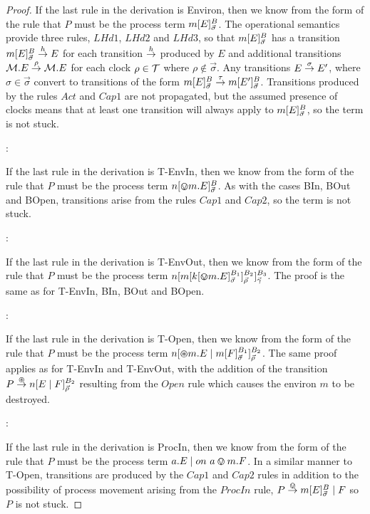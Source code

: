 \begin{proof}
\noindent If the last rule in the derivation is Environ, then we know
from the form of the rule that $P$ must be the process term
${m}[ E ]^{B}_{\vec{\sigma}}$.  The operational semantics provide
three rules, $LHd1$, $LHd2$ and $LHd3$, so that
${m}[ E ]^{B}_{\vec{\sigma}}$ has a transition
${m}[ E ]^{B}_{\vec{\sigma}} \stackrel{h}{\rightarrow} E$ for each transition
$\stackrel{h}{\rightarrow}$ produced by $E$ and additional transitions $\text{$\mathcal{M}$}.E
\stackrel{\rho}{\rightarrow} \text{$\mathcal{M}$}.E$ for each clock $\rho \in \text{$\mathcal{T}$}$ where $\rho
\not \in \vec{\sigma}$.  Any transitions $E \stackrel{\sigma}{\rightarrow} E'$,
where $\sigma \in \vec{\sigma}$ convert to transitions of the form
${m}[ E ]^{B}_{\vec{\sigma}} \stackrel{\tau}{\rightarrow}
{m}[ E' ]^{B}_{\vec{\sigma}}$.  Transitions produced by the rules
$Act$ and $Cap1$ are not propagated, but the assumed presence of
clocks means that at least one transition will always apply to
${m}[ E ]^{B}_{\vec{\sigma}}$, so the term is not stuck.

:

\noindent If the last rule in the derivation is T-EnvIn, then we know
from the form of the rule that $P$ must be the process term
${n}[ \varovee m.E ]^{B}_{\vec{\sigma}}$.  As with the cases BIn, BOut
and BOpen, transitions arise from the rules $Cap1$ and $Cap2$, so the
term is not stuck.

:

\noindent If the last rule in the derivation is T-EnvOut, then we know
from the form of the rule that $P$ must be the process term
${n}[ {m}[ {k}[ \varovee m.E ]^{B_1}_{\vec{\sigma}} ]^{B_2}_{\vec{\rho}} ]^{B_3}_{\vec{\gamma}}$.
The proof is the same as for T-EnvIn, BIn, BOut and BOpen.

:

\noindent If the last rule in the derivation is T-Open, then we know
from the form of the rule that $P$ must be the process term
${n}[ \varoast m.E \;|\;
  {m}[ F ]^{B_1}_{\vec{\sigma}} ]^{B_2}_{\vec{\rho}}$.  The same proof
applies as for T-EnvIn and T-EnvOut, with the addition of the
transition $P \stackrel{\varoast}{\rightarrow} {n}[ E \;|\; F ]^{B_2}_{\vec{\rho}}$
resulting from the $Open$ rule which causes the environ $m$ to be
destroyed.

:

\noindent If the last rule in the derivation is ProcIn, then we know
from the form of the rule that $P$ must be the process term $a.E \;|\;
on\ a \varovee m.F$.  In a similar manner to T-Open, transitions are
produced by the $Cap1$ and $Cap2$ rules in addition to the possibility
of process movement arising from the $ProcIn$ rule, $P \stackrel{\varovee}{\rightarrow}
{m}[ E ]^{B}_{\vec{\sigma}} \;|\; F$ so $P$ is not stuck.


\end{proof}
